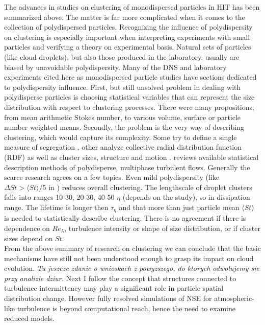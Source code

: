 \documentclass[../main.tex]{subfiles}
\begin{document}
The advances in studies on clustering of monodispersed particles in HIT has been summarized above. The matter is far more complicated when it comes to the collection of polydispersed particles. Recognizing the influence of polydispersity on clustering is especially important when interpreting experiments with small particles and verifying a theory on experimental basis. Natural sets of particles (like cloud droplets), but also those produced in the laboratory, usually are biased by unavoidable polydispersity. Many of the DNS and laboratory experiments cited here as monodispersed particle studies have sections dedicated to polydispersity influence. First, but still unsolved problem in dealing with polydisperse particles is choosing statistical variables that can represent the size distribution with respect to clustering processes. There were many propositions, from mean arithmetic Stokes number, to various volume, surface or particle number weighted means. Secondly, the problem is the very way of describing clustering, which would capture its complexity. Some try to define a single measure of segregation \citep{Calzavarini2008}, other analyze collective radial distribution function (RDF) \citep{Saw2012a, Saw2012b} as well as cluster sizes, structure and motion \citep{Lian2013, Lian2019}. \citet{Minier2016} reviews available statistical description methods of polydisperse, multiphase turbulent flows. Generally the scarce research agrees on a few topics. Even mild polydispersity (like $\Delta St > \langle St \rangle/5$ in \citet{Saw2012a, Saw2012b}) reduces overall clustering. The lengthscale of droplet clusters falls into ranges 10-30, 20-30, 40-50 $\eta$ (depends on the study), so in dissipation range. The lifetime is longer then $\tau_{\eta}$ and that more than just particle mean $\langle St \rangle$ is needed to statistically describe clustering. There is no agreement if there is dependence on $Re_{\lambda}$, turbulence intensity or shape of size distribution, or if cluster sizes depend on $St$.\\
From the above summary of research on clustering we can conclude that the basic mechanisms have still not been understood enough to grasp its impact on cloud evolution. \emph{Tu jeszcze zdanie o wnioskach z powyzszego, do ktorych odwolujemy sie przy analizie dziur.} Next I follow the concept that structures connected to turbulence intermittency may play a significant role in particle spatial distribution change. However fully resolved simulations of NSE for atmospheric-like turbulence is beyond computational reach, hence the need to examine reduced models.
\end{document}
